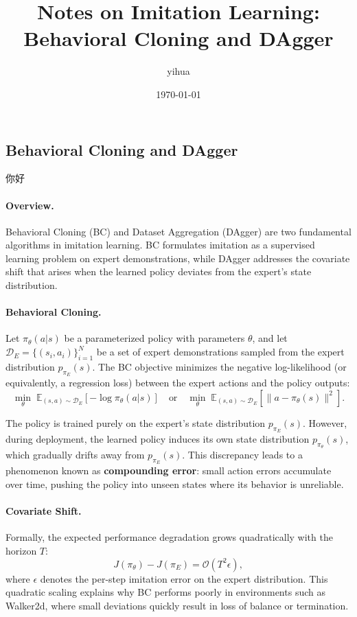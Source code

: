 \documentclass[12pt]{article}
\title{Notes on Imitation Learning: Behavioral Cloning and DAgger}
\author{yihua}
\date{\today}
\begin{document}
\maketitle

\subsection{Behavioral Cloning and DAgger}
\label{subsec:bc_dagger}
你好
\paragraph{Overview.}
Behavioral Cloning (BC) and Dataset Aggregation (DAgger) are two fundamental algorithms in imitation learning. 
BC formulates imitation as a supervised learning problem on expert demonstrations, while DAgger addresses the covariate shift that arises when the learned policy deviates from the expert’s state distribution.

\paragraph{Behavioral Cloning.}
Let $\pi_\theta(a|s)$ be a parameterized policy with parameters $\theta$, 
and let $\mathcal{D}_E = \{(s_i, a_i)\}_{i=1}^{N}$ be a set of expert demonstrations sampled from the expert distribution $p_{\pi_E}(s)$. 
The BC objective minimizes the negative log-likelihood (or equivalently, a regression loss) between the expert actions and the policy outputs:
\[
\min_{\theta} \; \mathbb{E}_{(s,a)\sim \mathcal{D}_E}\left[ - \log \pi_\theta(a|s) \right]
\quad \text{or} \quad
\min_{\theta} \; \mathbb{E}_{(s,a)\sim \mathcal{D}_E}\left[\| a - \pi_\theta(s) \|^2 \right].
\]

The policy is trained purely on the expert's state distribution $p_{\pi_E}(s)$. 
However, during deployment, the learned policy induces its own state distribution $p_{\pi_\theta}(s)$, which gradually drifts away from $p_{\pi_E}(s)$. 
This discrepancy leads to a phenomenon known as \textbf{compounding error}: small action errors accumulate over time, pushing the policy into unseen states where its behavior is unreliable.

\paragraph{Covariate Shift.}
Formally, the expected performance degradation grows quadratically with the horizon $T$:
\[
J(\pi_\theta) - J(\pi_E) = \mathcal{O}(T^2 \epsilon),
\]
where $\epsilon$ denotes the per-step imitation error on the expert distribution. 
This quadratic scaling explains why BC performs poorly in environments such as Walker2d, 
where small deviations quickly result in loss of balance or termination.
\end{document}
